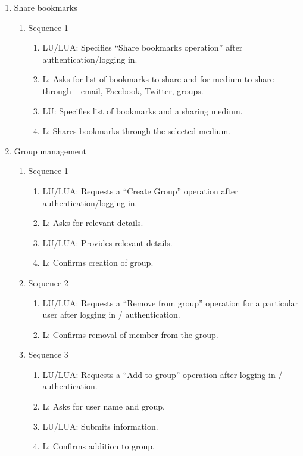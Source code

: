 \documentclass[11pt]{report} %
\begin{document}
\begin{enumerate}
\item
	Share bookmarks
		\begin{enumerate}
			\item
				Sequence 1
					\begin{enumerate}
						\item
							LU/LUA: Specifies “Share bookmarks operation” after authentication/logging in.
						\item
							L: Asks for list of bookmarks to share and for medium to share through – email, Facebook, Twitter, groups.
						\item
							LU: Specifies list of bookmarks and a sharing medium.
						\item
							L: Shares bookmarks through the selected medium.
					\end{enumerate}
		\end{enumerate}

\item
	Group management
		\begin{enumerate}
			\item
				Sequence 1
					\begin{enumerate}
						\item
							LU/LUA: Requests a “Create Group” operation after authentication/logging in.
						\item
							L: Asks for relevant details.
						\item
							LU/LUA: Provides relevant details.
						\item
							L: Confirms creation of group.
					\end{enumerate}

			\item
				Sequence 2
					\begin{enumerate}
						\item
							LU/LUA: Requests a “Remove from group” operation for a particular user after logging in / authentication.
						\item
							L: Confirms removal of member from the group.
					\end{enumerate}

			\item
				Sequence 3
					\begin{enumerate}
						\item
							LU/LUA: Requests a “Add to group” operation after logging in / authentication.
						\item
							L: Asks for user name and group.
						\item
							LU/LUA: Submits information.
						\item
							L: Confirms addition to group.
					\end{enumerate}


\end{enumerate}
\end{enumerate}
\end{document}

